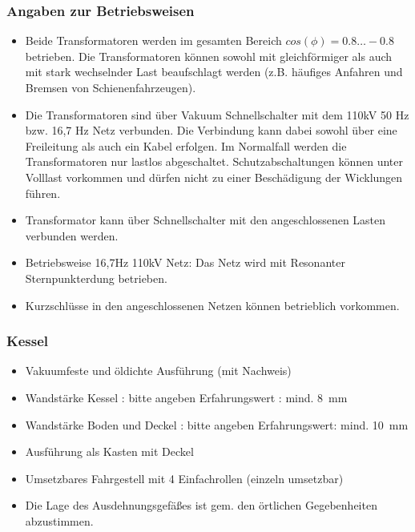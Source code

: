 \subsubsection*{Angaben zur Betriebsweisen}
\begin{itemize}[noitemsep]
    \item Beide Transformatoren werden im gesamten Bereich $cos(\phi)=0.8\ldots-0.8$ betrieben. Die Transformatoren können sowohl mit gleichförmiger als auch mit stark wechselnder Last beaufschlagt werden (z.B. häufiges Anfahren und Bremsen von Schienenfahrzeugen).
    \item  Die Transformatoren sind über Vakuum Schnellschalter mit dem 110kV 50 Hz bzw. 16,7 Hz Netz verbunden. Die Verbindung kann dabei sowohl über eine Freileitung als auch ein Kabel erfolgen. 
    Im Normalfall werden die Transformatoren nur lastlos abgeschaltet. Schutzabschaltungen können unter Volllast vorkommen und dürfen nicht zu einer Beschädigung der Wicklungen führen. 
    \item Transformator kann über Schnellschalter mit den angeschlossenen Lasten verbunden werden. 
    \item  Betriebsweise 16,7Hz 110kV Netz: Das Netz wird mit Resonanter Sternpunkterdung betrieben. 
    \item  Kurzschlüsse in den angeschlossenen Netzen können betrieblich vorkommen. 

\end{itemize}

\subsubsection*{Kessel}
\begin{itemize}[noitemsep]
    \item Vakuumfeste und öldichte Ausführung (mit Nachweis)
    \item Wandstärke Kessel : bitte angeben	Erfahrungswert : mind. \SI[]{8}[]{\mm}
    \item Wandstärke Boden und Deckel : bitte angeben	Erfahrungswert: mind. \SI[]{10}[]{\mm}
    \item Ausführung als Kasten mit Deckel
    \item Umsetzbares Fahrgestell mit 4 Einfachrollen (einzeln umsetzbar)
    \item Die Lage des Ausdehnungsgefäßes ist gem. den örtlichen Gegebenheiten abzustimmen.
\end{itemize}
